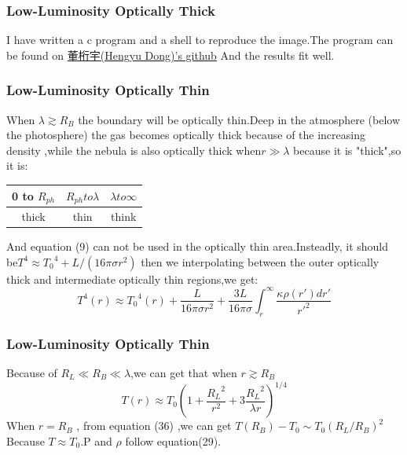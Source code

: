 \documentclass{beamer}
\begin{document}
\begin{frame}
\frametitle{Low-Luminosity Optically Thick}
I have written a c program and a shell to reproduce the image.The program can be found on \href{https://github.com/little-potato-loria/plot2.git}{董桁宇(Hengyu Dong)'s github}
 And the results fit well.
\end{frame}

\begin{frame}
\frametitle{Low-Luminosity Optically Thin}
When $\lambda \gtrsim R_B$ the boundary will be optically thin.Deep in the atmosphere (below the photosphere) the gas becomes optically thick because of the increasing density ,while the nebula is also optically thick when$r\gg \lambda$ because it is "thick",so it is:
\begin{table}
\centering
\begin{tabular}{|c|c|c|}
\hline
0 to $R_{ph}$ & $R_{ph} to \lambda$ & $\lambda to \infty$\\
\hline
thick & thin & think \\
\hline
\end{tabular}
\end{table}
And equation (9) can not be used in the optically thin area.Insteadly, it should be$ T^4\approx {T_0}^4 +L/(16 \pi \sigma r^2)$ then we interpolating between the outer optically thick and intermediate optically thin regions,we get:
\begin{equation}
T^4 (r) \approx {T_0}^4 (r)+\frac{L}{16 \pi \sigma r^2}+\frac{3L}{16 \pi \sigma}\int_{r}^{\infty}\frac{\kappa \rho(r')dr'}{{r'}^2}
\end{equation}
\end{frame}

\begin{frame}
\frametitle{Low-Luminosity Optically Thin}
Because of $R_L \ll R_B \ll \lambda$,we can get that when $r \gtrsim R_B$
\begin{equation}
T (r) \approx T_0{(1+\frac{{R_L}^2}{r^2}+3\frac{{R_L}^2}{\lambda r})}^{1/4}
\end{equation}
When $r =R_B$ , from equation (36) ,we can get $T(R_B)-T_0 \sim T_0(R_L /R_B)^2$\\
Because $T\approx T_0$.P and $\rho$ follow equation(29).
\end{frame}
\end{document}
